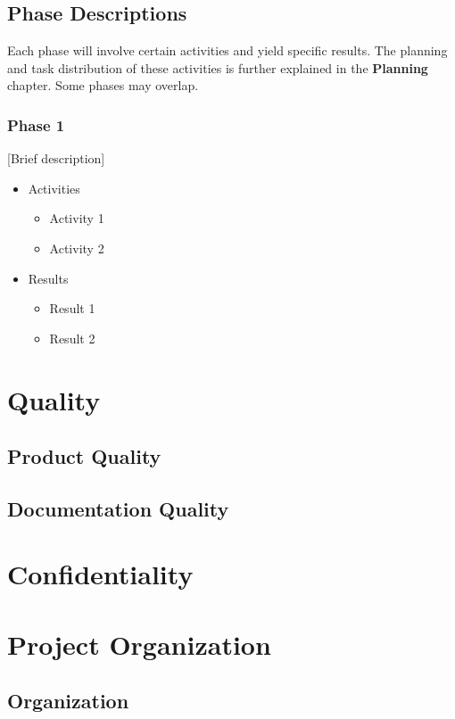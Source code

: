 \documentclass{article}
\begin{document}
\subsection{Phase Descriptions}
Each phase will involve certain activities and yield specific results. The planning and task distribution of these activities is further explained in the \textbf{Planning} chapter. Some phases may overlap.

\subsubsection{Phase 1}
[Brief description]
\begin{itemize}
    \item Activities
    \begin{itemize}
        \item Activity 1
        \item Activity 2
    \end{itemize}
    \item Results
    \begin{itemize}
        \item Result 1
        \item Result 2
    \end{itemize}
\end{itemize}


\newpage
\section{Quality}
\subsection{Product Quality}
\subsection{Documentation Quality}


\newpage
\section{Confidentiality}


\newpage
\section{Project Organization}
\subsection{Organization}
\end{document}
